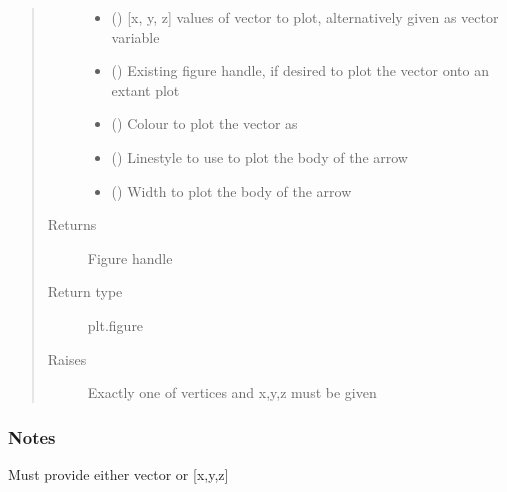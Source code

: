 \documentclass[letterpaper,10pt,english]{sphinxmanual}
\begin{document}
\begin{fulllineitems}
\begin{quote}
\begin{description}
\begin{itemize}
\item {} 
\sphinxAtStartPar
{} () \textendash{} {[}x, y, z{]} values of vector to plot, alternatively given as vector variable

\item {} 
\sphinxAtStartPar
{} (\sphinxstyleliteralemphasis{\sphinxupquote{, }}) \textendash{} Existing figure handle, if desired to plot the vector onto an extant plot

\item {} 
\sphinxAtStartPar
{} (\sphinxstyleliteralemphasis{\sphinxupquote{, }}) \textendash{} Colour to plot the vector as

\item {} 
\sphinxAtStartPar
{} (\sphinxstyleliteralemphasis{\sphinxupquote{, }}) \textendash{} Linestyle to use to plot the body of the arrow

\item {} 
\sphinxAtStartPar
{} (\sphinxstyleliteralemphasis{\sphinxupquote{, }}) \textendash{} Width to plot the body of the arrow

\end{itemize}

\item[{Returns}] \leavevmode
\sphinxAtStartPar
{} \textendash{} Figure handle

\item[{Return type}] \leavevmode
\sphinxAtStartPar
plt.figure

\item[{Raises}] \leavevmode
\sphinxAtStartPar
{} \textendash{} Exactly one of vertices and x,y,z must be given

\end{description}\end{quote}
\subsubsection*{Notes}

\sphinxAtStartPar
Must provide either vector or {[}x,y,z{]}

\end{fulllineitems}
\end{document}
